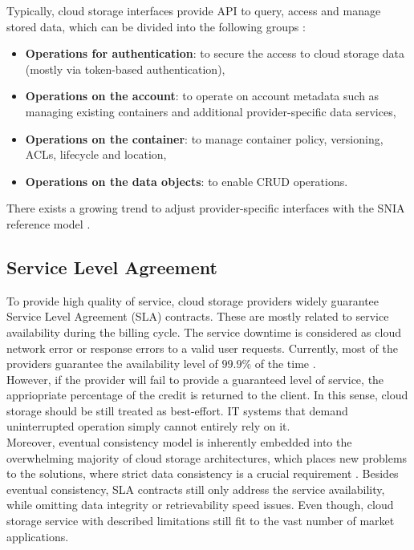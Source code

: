 Typically, cloud storage interfaces provide API to query, access and manage
stored data, which can be divided into the following groups
\cite{amazon-s3, rackspace-cloud, google-cloud, openstack-cloud, 
eucalyptus-cloud}:\\

\begin{itemize}
	\item \textbf{Operations for authentication}: to secure the access to
	cloud storage data (mostly via token-based authentication),  
	\item \textbf{Operations on the account}: to operate on account metadata
	such as managing existing containers and additional provider-specific data
	services,
	\item \textbf{Operations on the container}: to manage container policy, 
	versioning, ACLs, lifecycle and location,
	\item \textbf{Operations on the data objects}: to enable CRUD operations.
\end{itemize} 

There exists a growing trend to adjust provider-specific interfaces with the
SNIA reference model \cite{amazon-s3, rackspace-cloud, openstack-cloud}.
		
		\subsection{Service Level Agreement}
To provide high quality of service, cloud storage providers widely guarantee
Service Level Agreement (SLA) contracts. These are mostly related to service
availability during the billing cycle. The service downtime is considered as
cloud network error or response errors to a valid user requests. Currently,
most of the providers guarantee the availability level of $99.9\%$ of the time
\cite{amazon-s3, rackspace-cloud, google-cloud}.\\

However, if the provider will fail to provide a guaranteed level of service,
the appriopriate percentage of the credit is returned to the client. In this
sense, cloud storage should be still treated as best-effort. IT systems that
demand uninterrupted operation simply cannot entirely rely on it.\\

Moreover, eventual consistency model is inherently embedded into the
overwhelming majority of cloud storage architectures, which places new problems
to the solutions, where strict data consistency is a crucial requirement
\cite{metastorage, cloud-federation}. Besides eventual consistency, SLA
contracts still only address the service availability, while omitting data
integrity or retrievability speed issues. Even though, cloud storage service
with described limitations still fit to the vast number of market 
applications.\\

